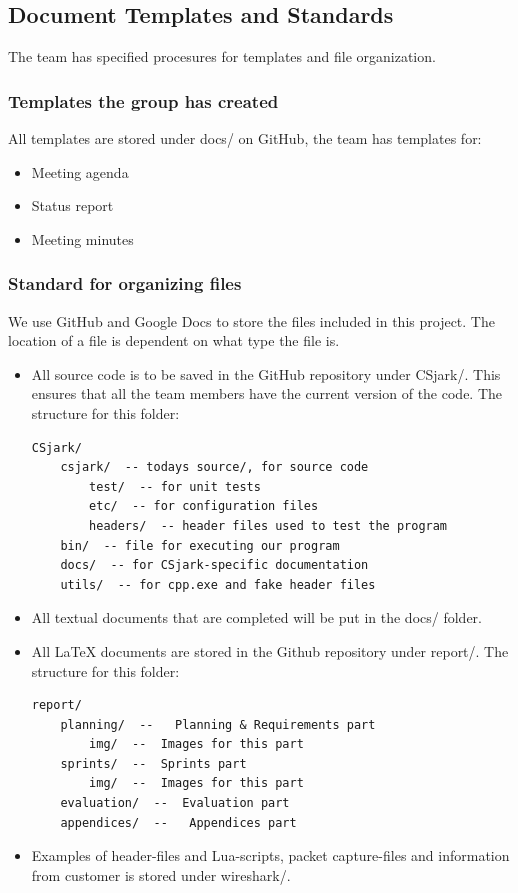 \subsection{Document Templates and Standards}
The team has specified procesures for templates and file organization.

\subsubsection{Templates the group has created}
All templates are stored under docs/ on GitHub, the team has templates for:

\begin{itemize}
	\item Meeting agenda
	\item Status report
	\item Meeting minutes
\end{itemize}

\subsubsection{Standard for organizing files}
We use GitHub and Google Docs to store the files included in this project. The
location of a file is dependent on what type the file is. 

\begin{itemize}
	\item All source code is to be saved in the GitHub repository under
		CSjark/. This ensures that all the team members have the current
		version of the code. The structure for this folder:
		\begin{verbatim}
CSjark/
    csjark/  -- todays source/, for source code
        test/  -- for unit tests
        etc/  -- for configuration files
        headers/  -- header files used to test the program
    bin/  -- file for executing our program
    docs/  -- for CSjark-specific documentation
    utils/  -- for cpp.exe and fake header files
		\end{verbatim}
	\item All textual documents that are completed will be put in the
		docs/ folder.
	\item All LaTeX documents are stored in the Github repository
		under report/. The structure for this folder:
		\begin{verbatim}
report/
    planning/  --   Planning & Requirements part
        img/  --  Images for this part
    sprints/  --  Sprints part
        img/  --  Images for this part
    evaluation/  --  Evaluation part
    appendices/  --   Appendices part
		\end{verbatim}
	\item Examples of header-files and Lua-scripts, packet capture-files and information from customer is stored under wireshark/.
\end{itemize}

